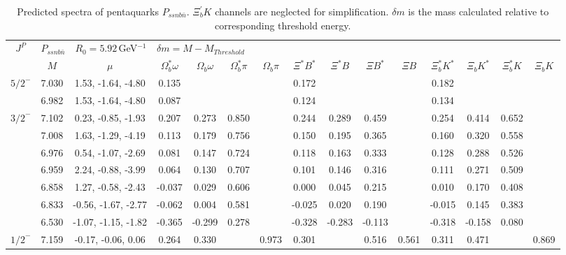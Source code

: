 \documentclass[prd,twocolumn,floatfix,nofootinbib]{revtex4}
\begin{document}
\renewcommand{\tabcolsep}{0.1cm}
\renewcommand{\arraystretch}{1.0}
\begin{table*}[!htbp]
    \caption{Predicted spectra of pentaquarks $P_{ssnb\bar{n}}$.
        $\Xi_{b}^{\prime}K$ channels are neglected for simplification.
        $\delta m$ is the mass calculated relative to corresponding threshold energy.}
    \label{tab:ssnbn}
    \begin{tabular}{c|cc|cccccccccccc}
        \bottomrule[1.5pt]\bottomrule[0.5pt]
        \multirow{2}{*}{$J^{P}$} 
        &\multicolumn{2}{l|}{$P_{ssnb\bar{n}}\quad R_{0}=5.92\,$GeV$^{-1}$}
        &\multicolumn{12}{l}{$\delta m=M-M_{Threshold}$} \\
        &$M$ &$\mu$ &$\Omega_{b}^{\ast}\omega$ &$\Omega_{b}\omega$ &$\Omega_{b}^{\ast}\pi$ &$\Omega_{b}\pi$
        &$\Xi^{\ast}B^{\ast}$ &$\Xi^{\ast}B$ &$\Xi B^{\ast}$ &$\Xi B$
        &$\Xi_{b}^{\ast}K^{\ast}$ &$\Xi_{b}K^{\ast}$ &$\Xi_{b}^{\ast}K$ &$\Xi_{b}K$ \\ \hline
            ${5/2}^{-}$     &7.030  &1.53, -1.64, -4.80 &0.135 & & & &0.172 & & & &0.182 & & & \\
                            &6.982  &1.53, -1.64, -4.80 &0.087 & & & &0.124 & & & &0.134 & & & \\
            ${3/2}^{-}$     &7.102  &0.23, -0.85, -1.93 &0.207 &0.273 &0.850 & &0.244 &0.289 &0.459 & &0.254 &0.414 &0.652 & \\
                            &7.008  &1.63, -1.29, -4.19 &0.113 &0.179 &0.756 & &0.150 &0.195 &0.365 & &0.160 &0.320 &0.558 & \\
                            &6.976  &0.54, -1.07, -2.69 &0.081 &0.147 &0.724 & &0.118 &0.163 &0.333 & &0.128 &0.288 &0.526 & \\
                            &6.959  &2.24, -0.88, -3.99 &0.064 &0.130 &0.707 & &0.101 &0.146 &0.316 & &0.111 &0.271 &0.509 & \\
                            &6.858  &1.27, -0.58, -2.43 &-0.037 &0.029 &0.606 & &0.000 &0.045 &0.215 & &0.010 &0.170 &0.408 & \\
                            &6.833  &-0.56, -1.67, -2.77 &-0.062 &0.004 &0.581 & &-0.025 &0.020 &0.190 & &-0.015 &0.145 &0.383 & \\
                            &6.530  &-1.07, -1.15, -1.82 &-0.365 &-0.299 &0.278 & &-0.328 &-0.283 &-0.113 & &-0.318 &-0.158 &0.080 & \\
            ${1/2}^{-}$     &7.159  &-0.17, -0.06, 0.06 &0.264 &0.330 & &0.973 &0.301 & &0.516 &0.561 &0.311 &0.471 & &0.869 \\

\end{tabular}
\end{table*}
\end{document}
